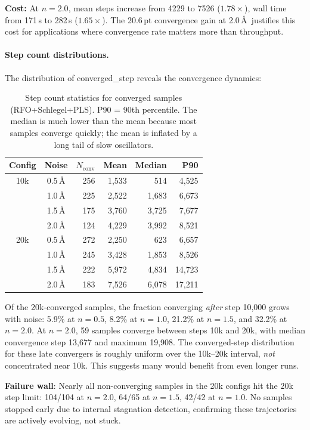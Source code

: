 \documentclass[11pt,a4paper]{article}
\theoremstyle{definition}
\begin{document}
\textbf{Cost:} At $n=2.0$, mean steps increase from 4229 to 7526 ($1.78\times$),
wall time from 171\,s to 282\,s ($1.65\times$).  The 20.6\,pt convergence
gain at 2.0\,\AA\ justifies this cost for applications where convergence
rate matters more than throughput.

\paragraph{Step count distributions.}
The distribution of converged\_step reveals the convergence dynamics:

\begin{table}[h]
\centering
\caption{Step count statistics for converged samples (RFO+Schlegel+PLS).
  P90 = 90th percentile.  The median is much lower than the mean because
  most samples converge quickly; the mean is inflated by a long tail of
  slow oscillators.}
\label{tab:step-distributions}
\begin{tabular}{ccrrrr}
\toprule
Config & Noise & $N_\text{conv}$ & Mean & Median & P90 \\
\midrule
10k & 0.5\,\AA & 256 & 1{,}533 & 514 & 4{,}525 \\
    & 1.0\,\AA & 225 & 2{,}522 & 1{,}683 & 6{,}673 \\
    & 1.5\,\AA & 175 & 3{,}760 & 3{,}725 & 7{,}677 \\
    & 2.0\,\AA & 124 & 4{,}229 & 3{,}992 & 8{,}521 \\
\midrule
20k & 0.5\,\AA & 272 & 2{,}250 & 623 & 6{,}657 \\
    & 1.0\,\AA & 245 & 3{,}428 & 1{,}853 & 8{,}526 \\
    & 1.5\,\AA & 222 & 5{,}972 & 4{,}834 & 14{,}723 \\
    & 2.0\,\AA & 183 & 7{,}526 & 6{,}078 & 17{,}211 \\
\bottomrule
\end{tabular}
\end{table}

Of the 20k-converged samples, the fraction converging \emph{after} step
10{,}000 grows with noise: 5.9\% at $n=0.5$, 8.2\% at $n=1.0$, 21.2\%
at $n=1.5$, and 32.2\% at $n=2.0$.  At $n=2.0$, 59 samples converge
between steps 10k and 20k, with median convergence step 13{,}677 and maximum
19{,}908.  The converged-step distribution for these late convergers is roughly
uniform over the 10k--20k interval, \emph{not} concentrated near 10k.
This suggests many would benefit from even longer runs.

\textbf{Failure wall}: Nearly all non-converging samples in the 20k configs
hit the 20k step limit: 104/104 at $n=2.0$, 64/65 at $n=1.5$, 42/42 at
$n=1.0$.  No samples stopped early due to internal stagnation detection,
confirming these trajectories are actively evolving, not stuck.
\end{document}
